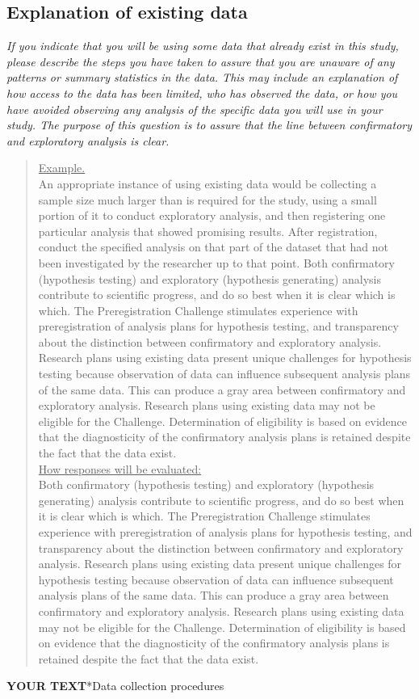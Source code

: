 \documentclass{article}
\newcommand{\example}[2]{\vspace{-0.3cm}\begin{quote}\underline{Example.}\\#1\ifx#2\undefined \else \\[0.2cm]\underline{How responses will be evaluated:}\\#2\fi\\\end{quote}}
\newcommand{\yourtext}[1]{\noindent\textbf{\color{red}YOUR TEXT}}
\begin{document}
	\subsection*{Explanation of existing data}
	
	\ifx\hidehints\undefined
	
	\textit{%
		If you indicate that you will be using some data that already exist in this study, please describe the steps you have taken to assure that you are unaware of any patterns or summary statistics in the data. This may include an explanation of how access to the data has been limited, who has observed the data, or how you have avoided observing any analysis of the specific data you will use in your study. The purpose of this question is to assure that the line between confirmatory and exploratory analysis is clear.
	}\\
	
	\example{
		 An appropriate instance of using existing data would be collecting a sample size much larger than is required for the study, using a small portion of it to conduct exploratory analysis, and then registering one particular analysis that showed promising results. After registration, conduct the specified analysis on that part of the dataset that had not been investigated by the researcher up to that point. 
	}{Both confirmatory (hypothesis testing) and exploratory (hypothesis generating) analysis contribute to scientific progress, and do so best when it is clear which is which. The Preregistration Challenge stimulates experience with preregistration of analysis plans for hypothesis testing, and transparency about the distinction between confirmatory and exploratory analysis. Research plans using existing data present unique challenges for hypothesis testing because observation of data can influence subsequent analysis plans of the same data. This can produce a gray area between confirmatory and exploratory analysis. Research plans using existing data may not be eligible for the Challenge. Determination of eligibility is based on evidence that the diagnosticity of the confirmatory analysis plans is retained despite the fact that the data exist.}
	\fi
	
	\yourtext
	
	\subsection*{Data collection procedures}
	
	\ifx\hidehints\undefined
	
\end{document}
